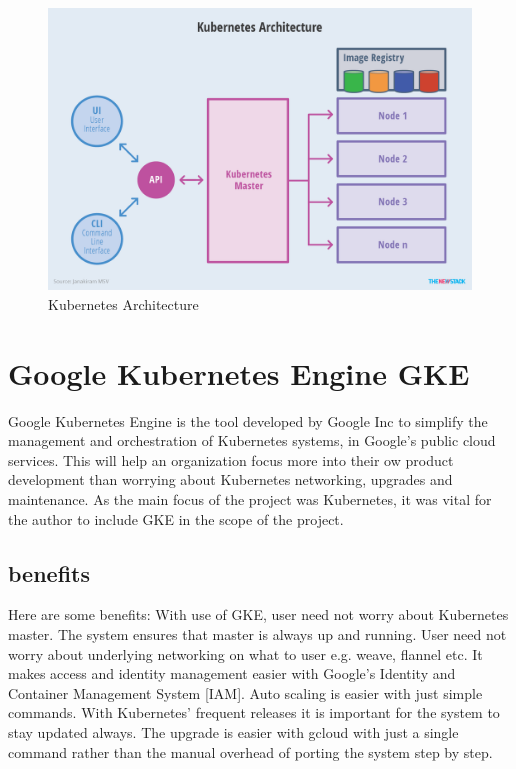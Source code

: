 \begin{figure}[htb]
	\centering\includegraphics[width=\columnwidth]
        {images/hid_417_Kubernetes-Architecture.png}
  \caption{Kubernetes Architecture~\cite{hid-sp18-417-kubernetes}}
  \label{fig:kube-archtecture}
\end{figure}

\section{ Google Kubernetes Engine GKE}

Google Kubernetes Engine is the tool developed by Google Inc to simplify the 
management and orchestration of Kubernetes systems, in Google's public cloud
 services. This will help an organization focus more into their ow product 
 development than worrying about Kubernetes networking, upgrades and 
 maintenance. As the main focus of the project was Kubernetes, it
was vital for the author to include GKE in the scope of the project.

\subsection{benefits}

Here are some benefits: With use of GKE, user need not worry about Kubernetes
 master. The system ensures that master is always up and running. User need not
  worry about underlying networking on what to user e.g. weave, flannel etc. 
  It makes access and identity management easier with Google's Identity and 
  Container Management System [IAM]. Auto scaling is easier with just simple 
  commands. With Kubernetes' frequent releases it is important for the system 
to stay updated always. The upgrade is easier with gcloud with just a single 
command rather than the manual overhead of porting the system step by step.

